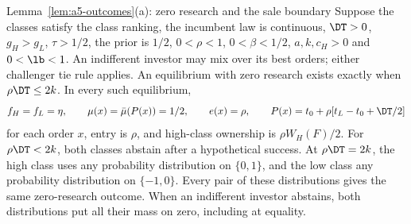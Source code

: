 \begin{named}{Lemma~\ref{lem:a5-outcomes}(a): zero research and the sale boundary}
Suppose the classes satisfy the class ranking, the incumbent law is continuous, \(\DT>0\), \(g_H>g_L\),
\(\tau>1/2\), the prior is \(1/2\), \(0<\rho<1\), \(0<\beta<1/2\), \(a,k,c_H>0\) and \(0<\lb<1\).
An indifferent investor may mix over its best orders; either challenger tie rule applies.
An equilibrium with zero research exists exactly when \(\rho\DT\le2k\). In every such equilibrium,
\[
 f_H=f_L=\eta,\qquad \mu(x)=\bar\mu(P(x))=1/2,\qquad e(x)=\rho,
 \qquad P(x)=t_0+\rho[t_L-t_0+\DT/2]
\]
for each order \(x\), entry is \(\rho\), and high-class ownership is \(\rho W_H(F)/2\).
For \(\rho\DT<2k\), both classes abstain after a hypothetical success. At \(\rho\DT=2k\), the high class uses
any probability distribution on \(\{0,1\}\), and the low class any probability distribution on \(\{-1,0\}\).
Every pair of these distributions gives the same zero-research outcome. When an indifferent investor abstains,
both distributions put all their mass on zero, including at equality.
\end{named}

